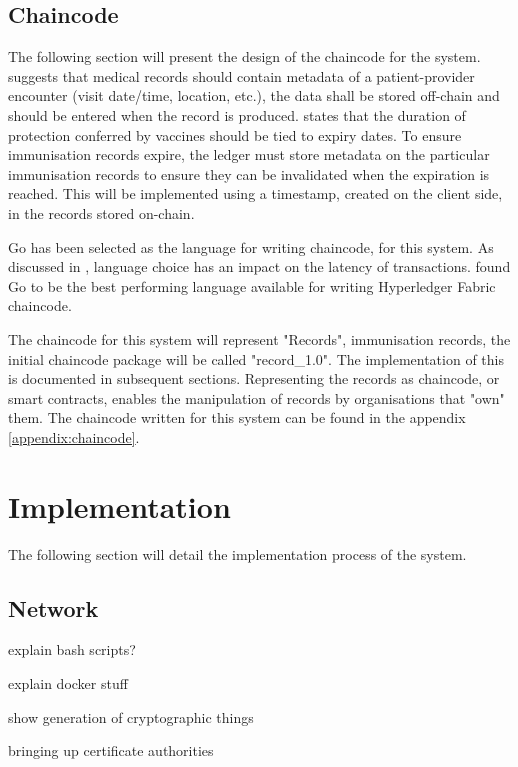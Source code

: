 \subsection{Chaincode}
The following section will present the design of the chaincode for the system. 
\cite{alexaki_blockchain-based_2018} suggests that medical records should contain metadata of a patient-provider encounter (visit date/time, location, etc.), 
the data shall be stored off-chain and should be entered when the record is produced. 
\cite{dye_covid-19_2021} states that the duration of protection conferred by vaccines should
be tied to expiry dates.
To ensure immunisation records expire, the ledger must store metadata on the particular immunisation records to ensure they can be invalidated when the expiration is reached. 
This will be implemented using a timestamp, created on the client side, in the records stored on-chain. 

Go has been selected as the language for writing chaincode, for this system. 
As discussed in \cite{foschini_hyperledger_2020}, language choice has an impact on the latency of transactions. 
\cite{foschini_hyperledger_2020} found Go to be the best performing language available for writing Hyperledger Fabric chaincode.  

The chaincode for this system will represent "Records", immunisation records, the initial chaincode package will be called "record\_1.0". The implementation of this is documented in subsequent sections. 
Representing the records as chaincode, or smart contracts, enables the manipulation of records by organisations that "own" them. 
The chaincode written for this system can be found in the appendix \ref{appendix:chaincode}. 



\section{Implementation}
The following section will detail the implementation process of the system.

\subsection{Network}

explain bash scripts? 

explain docker stuff 

show generation of cryptographic things

bringing up certificate authorities %

